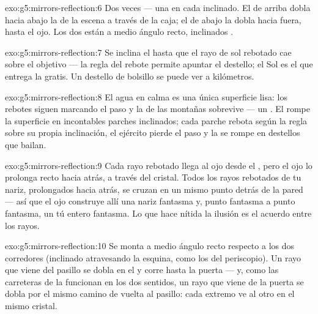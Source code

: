 \begin{solution}{exo:g5:mirrors-reflection:6}
Dos veces --- una en cada  inclinado. El  de arriba
dobla hacia abajo la  de la escena a través de la caja; el de
abajo la dobla hacia fuera, hasta el ojo. Los dos están a medio ángulo
recto, inclinados .
\end{solution}

\begin{solution}{exo:g5:mirrors-reflection:7}
Se inclina el  hasta que el rayo de sol rebotado cae sobre el
objetivo --- la regla del rebote permite apuntar el destello; el Sol
es el  que entrega la  gratis. Un destello
de bolsillo se puede ver a kilómetros.
\end{solution}

\begin{solution}{exo:g5:mirrors-reflection:8}
El agua en calma es una única superficie lisa: los rebotes siguen
marcando el paso y la  de las montañas sobrevive --- un
. El  rompe la superficie en incontables parches
inclinados; cada parche rebota según la regla sobre su propia
inclinación, el ejército pierde el paso y la  se rompe en
destellos que bailan.
\end{solution}

\begin{solution}{exo:g5:mirrors-reflection:9}
Cada rayo rebotado llega al ojo desde el , pero el ojo lo
prolonga recto hacia atrás, a través del cristal. Todos los rayos
rebotados de tu nariz, prolongados hacia atrás, se cruzan en un mismo
punto detrás de la pared --- así que el ojo construye allí una nariz
fantasma y, punto fantasma a punto fantasma, un tú entero fantasma. Lo
que hace nítida la ilusión es el acuerdo entre los rayos.
\end{solution}

\begin{solution}{exo:g5:mirrors-reflection:10}
Se monta a medio ángulo recto respecto a los dos corredores
(inclinado atravesando la esquina, como los  del
periscopio). Un rayo que viene del pasillo se dobla en el  y
corre hasta la puerta --- y, como las carreteras de la 
funcionan en los dos sentidos, un rayo que viene de la puerta se dobla
por el mismo camino de vuelta al pasillo: cada extremo ve al otro en
el mismo cristal.
\end{solution}

